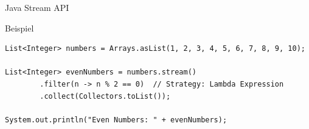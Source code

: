 \begin{frame}[fragile]{Java Stream API}
	\begin{exampleblock}{Beispiel}
		\begin{lstlisting}
List<Integer> numbers = Arrays.asList(1, 2, 3, 4, 5, 6, 7, 8, 9, 10);

List<Integer> evenNumbers = numbers.stream()
        .filter(n -> n % 2 == 0)  // Strategy: Lambda Expression
        .collect(Collectors.toList());

System.out.println("Even Numbers: " + evenNumbers);
		\end{lstlisting}
	 \end{exampleblock}
\end{frame}

